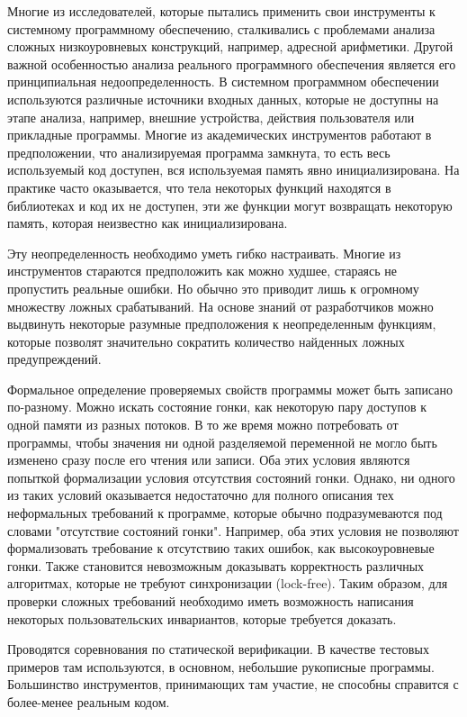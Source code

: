 Многие из исследователей, которые пытались применить свои инструменты к системному программному обеспечению, сталкивались с проблемами анализа сложных низкоуровневых конструкций, например, адресной арифметики.
Другой важной особенностью анализа реального программного обеспечения является его принципиальная недоопределенность.
В системном программном обеспечении используются различные источники входных данных, которые не доступны на этапе анализа, например, внешние устройства, действия пользователя или прикладные программы. 
Многие из академических инструментов работают в предположении, что анализируемая программа замкнута, то есть весь используемый код доступен, вся используемая память явно инициализирована.
На практике часто оказывается, что тела некоторых функций находятся в библиотеках и код их не доступен, эти же функции могут возвращать некоторую память, которая неизвестно как инициализирована.

Эту неопределенность необходимо уметь гибко настраивать. 
Многие из инструментов стараются предположить как можно худшее, стараясь не пропустить реальные ошибки.
Но обычно это приводит лишь к огромному множеству ложных срабатываний.
На основе знаний от разработчиков можно выдвинуть некоторые разумные предположения к неопределенным функциям, которые позволят значительно сократить количество найденных ложных предупреждений.

Формальное определение проверяемых свойств программы может быть записано по-разному.
Можно искать состояние гонки, как некоторую пару доступов к одной памяти из разных потоков.
В то же время можно потребовать от программы, чтобы значения ни одной разделяемой переменной не могло быть изменено сразу после его чтения или записи.
Оба этих условия являются попыткой формализации условия отсутствия состояний гонки.
Однако, ни одного из таких условий оказывается недостаточно для полного описания тех неформальных требований к программе, которые обычно подразумеваются под словами "отсутствие состояний гонки".
Например, оба этих условия не позволяют формализовать требование к отсутствию таких ошибок, как высокоуровневые гонки.
Также становится невозможным доказывать корректность различных алгоритмах, которые не требуют синхронизации (lock-free).
Таким образом, для проверки сложных требований необходимо иметь возможность написания некоторых пользовательских инвариантов, которые требуется доказать.

Проводятся соревнования по статической верификации. В качестве тестовых примеров там используются, в основном, небольшие рукописные программы.
Большинство инструментов, принимающих там участие, не способны справится с более-менее реальным кодом.

